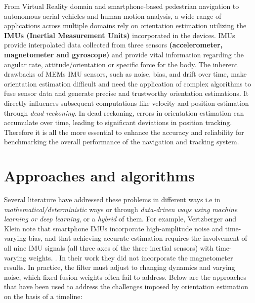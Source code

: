 \documentclass{iutbscthesis}
\begin{document}
From Virtual Reality domain and smartphone-based pedestrian navigation to autonomous aerial vehicles and human motion analysis, a wide range of applications across multiple domains rely on orientation estimation utilizing the \textbf{IMUs (Inertial Measurement Units)} incorporated in the devices. IMUs provide interpolated data collected from three sensors \textbf{(accelerometer, magnetometer and gyroscope)} and provide vital information regarding the angular rate, attitude/orientation or specific force for the body. The inherent drawbacks of MEMs IMU sensors, such as noise, bias, and drift over time, make orientation estimation difficult and need the application of complex algorithms to fuse sensor data and generate precise and trustworthy orientation estimations. It directly influences subsequent computations like velocity and position estimation through \textit{dead reckoning}. In dead reckoning, errors in orientation estimation can accumulate over time, leading to significant deviations in position tracking. Therefore it is all the more essential to enhance the accuracy and reliability for benchmarking the overall performance of the navigation and tracking system.
 

\section{Approaches and algorithms}
Several literature have addressed these problems in different ways i.e in \textit{mathematical/deterministic} ways or through \textit{data-driven ways using machine learning or deep learning}, or a \textit{hybrid} of them. For example, Vertzberger and Klein note that smartphone IMUs incorporate high-amplitude noise and time-varying bias, and that achieving accurate estimation requires the involvement of all nine IMU signals (all three axes of the three inertial sensors) with time-varying weights. \cite{vertzberger2022adaptive}. In their work they did not incorporate the magnetometer results. In practice, the filter must adjust to changing dynamics and varying noise, which fixed fusion weights often fail to address. Below are the approaches that have been used to address the challenges imposed by orientation estimation on the basis of a timeline:
\end{document}
